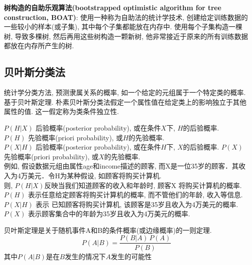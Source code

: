 \documentclass{article}
\begin{document}
\textbf{树构造的自助乐观算法(bootstrapped optimistic algorithm for tree construction, BOAT)}: 使用一种称为自助法的统计学技术, 
创建给定训练数据的一些较小的样本(或子集), 其中每个子集都能放在内存中.
使用每个子集构造一棵树, 导致多棵树, 然后再用这些树构造一颗新树, 他非常接近于原来的所有训练数据都放在内存所产生的树.

\subsection{贝叶斯分类法}
统计学分类方法, 预测隶属关系的概率, 如一个给定的元组属于一个特定类的概率.\\
基于贝叶斯定理. 朴素贝叶斯分类法假定一个属性值在给定类上的影响独立于其他属性的值. 这一假定称为类条件独立性.

\noindent
$P(H |X)$ 后验概率(posterior probability), 或在条件$X$下, $H$的后验概率.\\
$P(H)$ 先验概率(priori probability), 或$H$的先验概率.\\
$P(X|H)$ 后验概率(posterior probability), 或在条件$H$下, $X$的后验概率.
$P(X)$ 先验概率(priori probability), 或$X$的先验概率.\\

例如, 假设数据元组由属性age和income描述的顾客, 而X是一位35岁的顾客．其收入为4万美元．令H为某种假设, 如顾客将购买计算机.\\
则, $P(H|X)$反映当我们知道顾客的收入和年龄时, 顾客X 将购买计算机的概率.\\
$P(H)$ 表示任意给定顾客将购买计算机的概率, 而不管他们的年龄, 收入等信息.\\
$P(X|H)$ 表示 已知顾客将购买计算机, 该顾客是35岁且收入为4万美元的概率.\\
$P(X)$ 表示顾客集合中的年龄为35岁且收入为4万美元的概率.

贝叶斯定理是关于随机事件A和B的条件概率(或边缘概率)的一则定理.
$$ P(A|B) = \frac{P(B | A)\, P(A)}{P(B)} $$
其中$P(A|B)$是在$B$发生的情况下$A$发生的可能性
\end{document}
